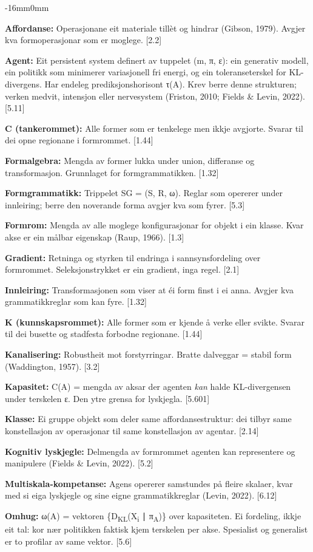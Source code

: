\documentclass[10pt,oneside]{book}
\newcommand{\msym}[1]{{\mathfbfont #1}}
\newcommand{\silentchapter}[2]{%
  \clearpage
  \markboth{#2}{}%
  \addcontentsline{toc}{chapter}{#1}%
}
\newenvironment{ordliste}{%
  \begingroup\footnotesize\setlength{\parskip}{0.3pt plus 0.1pt}%
  \linespread{0.92}\selectfont
}{%
  \endgroup
}
\newcommand{\ordlisteentry}[2]{%
  \par\addvspace{1.5pt}%
  \noindent\textbf{#1:} #2\par%
}
\newenvironment{widebody}{%
  \begin{adjustwidth}{-16mm}{0mm}%
}{%
  \end{adjustwidth}%
}
\begin{document}
\silentchapter{Ordliste}{ordliste}
\begin{widebody}
\begin{ordliste}
\ordlisteentry{Affordanse}{Operasjonane eit materiale tillèt og hindrar (Gibson, 1979). Avgjer kva formoperasjonar som er moglege. [2.2]}
\ordlisteentry{Agent}{Eit persistent system definert av tuppelet (m, \msym{π}, \msym{ε}): ein generativ modell, ein politikk som minimerer variasjonell fri energi, og ein toleranseterskel for KL-divergens. Har endeleg prediksjonshorisont \msym{τ(A)}. Krev berre denne strukturen; verken medvit, intensjon eller nervesystem (Friston, 2010; Fields \& Levin, 2022). [5.11]}
\ordlisteentry{C (tankerommet)}{Alle former som er tenkelege men ikkje avgjorte. Svarar til dei opne regionane i formrommet. [1.44]}
\ordlisteentry{Formalgebra}{Mengda av former lukka under union, differanse og transformasjon. Grunnlaget for formgrammatikken. [1.32]}
\ordlisteentry{Formgrammatikk}{Trippelet SG = (S, R, \msym{ω}). Reglar som opererer under innleiring; berre den noverande forma avgjer kva som fyrer. [5.3]}
\ordlisteentry{Formrom}{Mengda av alle moglege konfigurasjonar for objekt i ein klasse. Kvar akse er ein målbar eigenskap (Raup, 1966). [1.3]}
\ordlisteentry{Gradient}{Retninga og styrken til endringa i sannsynsfordeling over formrommet. Seleksjonstrykket er ein gradient, inga regel. [2.1]}
\ordlisteentry{Innleiring}{Transformasjonen som viser at éi form finst i ei anna. Avgjer kva grammatikkreglar som kan fyre. [1.32]}
\ordlisteentry{K (kunnskapsrommet)}{Alle former som er kjende å verke eller svikte. Svarar til dei busette og stadfesta forbodne regionane. [1.44]}
\ordlisteentry{Kanalisering}{Robustheit mot forstyrringar. Bratte dalveggar = stabil form (Waddington, 1957). [3.2]}
\ordlisteentry{Kapasitet}{C(A) = mengda av aksar der agenten \textit{kan} halde KL-divergensen under terskelen \msym{ε}. Den ytre grensa for lyskjegla. [5.601]}
\ordlisteentry{Klasse}{Ei gruppe objekt som deler same affordansestruktur: dei tilbyr same konstellasjon av operasjonar til same konstellasjon av agentar. [2.14]}
\ordlisteentry{Kognitiv lyskjegle}{Delmengda av formrommet agenten kan representere og manipulere (Fields \& Levin, 2022). [5.2]}
\ordlisteentry{Multiskala-kompetanse}{Agens opererer samstundes på fleire skalaer, kvar med si eiga lyskjegle og sine eigne grammatikkreglar (Levin, 2022). [6.12]}
\ordlisteentry{Omhug}{\msym{ω}(A) = vektoren \{D\textsubscript{KL}(X\textsubscript{i} \msym{∣} \msym{π}\textsubscript{A})\} over kapasiteten. Ei fordeling, ikkje eit tal: kor nær politikken faktisk kjem terskelen per akse. Spesialist og generalist er to profilar av same vektor. [5.6]}

\end{ordliste}
\end{widebody}
\end{document}

